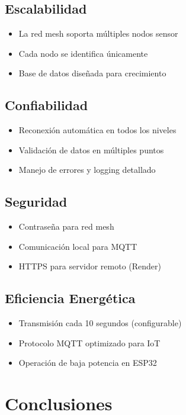 \documentclass[12pt]{article}
\begin{document}
\subsection{Escalabilidad}
\begin{itemize}
    \item La red mesh soporta múltiples nodos sensor
    \item Cada nodo se identifica únicamente
    \item Base de datos diseñada para crecimiento
\end{itemize}

\subsection{Confiabilidad}
\begin{itemize}
    \item Reconexión automática en todos los niveles
    \item Validación de datos en múltiples puntos
    \item Manejo de errores y logging detallado
\end{itemize}

\subsection{Seguridad}
\begin{itemize}
    \item Contraseña para red mesh
    \item Comunicación local para MQTT
    \item HTTPS para servidor remoto (Render)
\end{itemize}

\subsection{Eficiencia Energética}
\begin{itemize}
    \item Transmisión cada 10 segundos (configurable)
    \item Protocolo MQTT optimizado para IoT
    \item Operación de baja potencia en ESP32
\end{itemize}

\section{Conclusiones}
\end{document}
